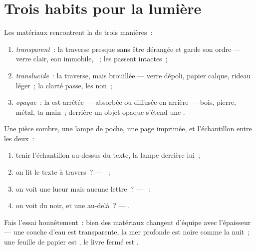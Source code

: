 \section{Trois habits pour la lumière}

\begin{definition}\label{def:g7:light-sources-propagation:coats}
Les matériaux rencontrent la  de trois manières~:
\begin{enumerate}
  \item \emph{transparent}~: la  traverse
        presque sans être dérangée et garde son ordre --- verre
        clair, eau immobile, ~; les  passent intactes~;
  \item \emph{translucide}~: la 
        traverse, mais brouillée --- verre dépoli, papier calque,
        rideau léger~; la clarté passe, les  non~;
  \item \emph{opaque}~: la  est arrêtée ---
        absorbée ou diffusée en arrière --- bois, pierre, métal, ta
        main~; derrière un objet opaque s'étend une .
\end{enumerate}
\end{definition}

\begin{method}\label{met:g7:light-sources-propagation:sort}
Une pièce sombre, une lampe de poche, une page imprimée, et
l'échantillon entre les deux~:
\begin{enumerate}
  \item tenir l'échantillon au-dessus du texte, la lampe derrière
        lui~;
  \item on lit le texte à travers~? --- ~;
  \item on voit une lueur mais aucune lettre~? --- ~;
  \item on voit du noir, et une  au-delà~? --- .
\end{enumerate}
Fais l'essai honnêtement~: bien des matériaux changent d'équipe avec
l'épaisseur --- une couche d'eau est transparente, la mer profonde
est noire comme la nuit~; une feuille de papier est , le
livre fermé est .
\end{method}

